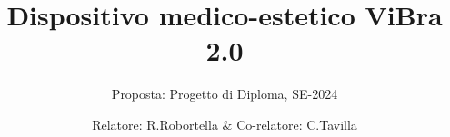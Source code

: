 \documentclass[12pt, t, aspectratio=169]{beamer}
\author{Relatore: R.Robortella $\&$ Co-relatore: C.Tavilla}
\title{Dispositivo medico-estetico ViBra 2.0}
\institute{ISEA-DTI-SUPSI}
\date{}
\subtitle{Proposta: Progetto di Diploma, SE-2024}
\begin{document}
\begin{frame}
\titlepage
\end{frame}


%
\end{document}
